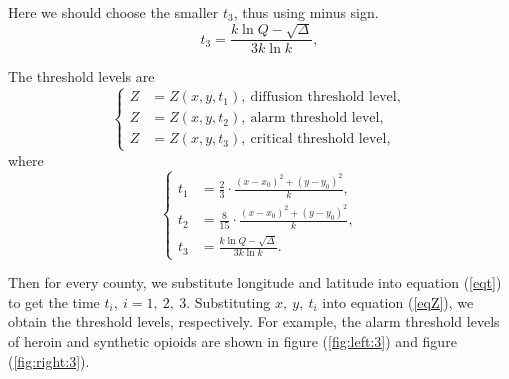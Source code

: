 \documentclass{mcmthesis}
\numberwithin{equation}{section}
\numberwithin{figure}{section}
\numberwithin{table}{section}
\theoremstyle{mydef}
\begin{document}
Here we should choose the smaller $t_3$, thus using minus sign.
\begin{equation}
t_3 = \frac{k\ln Q-\sqrt{\Delta}}{3k\ln k}, 
\end{equation}

The threshold levels are 
\begin{equation}
\left\{
\begin{aligned}
Z &= Z(x,y,t_1),\ \text{diffusion threshold level},\\
Z&=Z(x,y,t_2),\ \text{alarm threshold level},\\
Z&=Z(x,y,t_3),\ \text{critical threshold level},
\end{aligned}
\right.
\label{eqZ}
\end{equation}
where
\begin{equation}
\left\{
\begin{aligned}
t_1&=\frac{2}{3}\cdot\frac{(x-x_0)^2+(y-y_0)^2}{k},\\
t_2&=\frac{8}{15}\cdot\frac{(x-x_0)^2+(y-y_0)^2}{k},\\
t_3 &= \frac{k\ln Q-\sqrt{\Delta}}{3k\ln k}.
\end{aligned}
\right.
\label{eqt}
\end{equation}

Then for every county, we substitute longitude and latitude into equation (\ref{eqt}) to get the time $t_i,\ i=1,\ 2,\ 3$. Substituting $x,\ y,\ t_i$ into equation (\ref{eqZ}), we obtain the threshold levels, respectively. For example, the alarm threshold levels of heroin and synthetic opioids are shown in figure (\ref{fig:left:3}) and figure (\ref{fig:right:3}).
\end{document}
